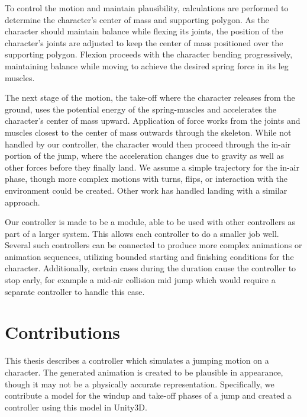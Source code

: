 To control the motion and maintain plausibility, calculations are performed to determine the character's center of mass and supporting polygon.  As the character should maintain balance while flexing its joints, the position of the character's joints are adjusted to keep the center of mass positioned over the supporting polygon.  Flexion proceeds with the character bending progressively, maintaining balance while moving to achieve the desired spring force in its leg muscles.

The next stage of the motion, the take-off where the character releases from the ground, uses the potential energy of the spring-muscles and accelerates the character's center of mass upward.  Application of force works from the joints and muscles closest to the center of mass outwards through the skeleton.  While not handled by our controller, the character would then proceed through the in-air portion of the jump, where the acceleration changes due to gravity as well as other forces before they finally land.  We assume a simple trajectory for the in-air phase, though more complex motions with turns, flips, or interaction with the environment could be created.  Other work has handled landing with a similar approach. \cite{falling_landing}%

Our controller is made to be a module, able to be used with other controllers as part of a larger system.  This allows each controller to do a smaller job well. Several such controllers can be connected to produce more complex animations or animation sequences, utilizing bounded starting and finishing conditions for the character. Additionally, certain cases during the duration cause the controller to stop early, for example a mid-air collision mid jump which would require a separate controller to handle this case.%


\section{Contributions}
	This thesis describes a controller which simulates a jumping motion on a character.  The generated animation is created to be plausible in appearance, though it may not be a physically accurate representation.  Specifically, we contribute a model for the windup and take-off phases of a jump and created a controller using this model in Unity3D.

